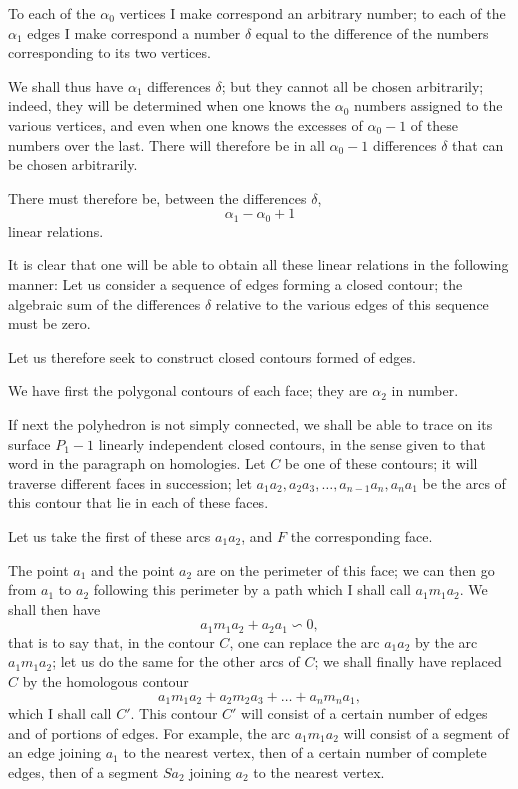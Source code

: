 \documentclass{article}
\begin{document}
To each of the $\alpha_{0}$ vertices I make correspond an arbitrary number; to each of the $\alpha_{1}$ edges I make correspond a number $\delta$ equal to the difference of the numbers corresponding to its two vertices.

We shall thus have $\alpha_{1}$ differences $\delta$; but they cannot all be chosen arbitrarily; indeed, they will be determined when one knows the $\alpha_{0}$ numbers assigned to the various vertices, and even when one knows the excesses of $\alpha_{0} - 1$ of these numbers over the last. There will therefore be in all $\alpha_{0} - 1$ differences $\delta$ that can be chosen arbitrarily.

There must therefore be, between the differences $\delta$,
\[ \alpha_{1} - \alpha_{0} + 1 \]
linear relations.

It is clear that one will be able to obtain all these linear relations in the following manner: Let us consider a sequence of edges forming a closed contour; the algebraic sum of the differences $\delta$ relative to the various edges of this sequence must be zero.

Let us therefore seek to construct closed contours formed of edges.

We have first the polygonal contours of each face; they are $\alpha_{2}$ in number.

If next the polyhedron is not simply connected, we shall be able to trace on its surface $P_{1} - 1$ linearly independent closed contours, in the sense given to that word in the paragraph on homologies. Let $C$ be one of these contours; it will traverse different faces in succession; let $a_{1}a_{2}, a_{2}a_{3}, \ldots, a_{n-1}a_{n}, a_{n}a_{1}$ be the arcs of this contour that lie in each of these faces.

Let us take the first of these arcs $a_{1}a_{2}$, and $F$ the corresponding face.

The point $a_{1}$ and the point $a_{2}$ are on the perimeter of this face; we can then go from $a_{1}$ to $a_{2}$ following this perimeter by a path which I shall call $a_{1}m_{1}a_{2}$. We shall then have
\[ a_{1}m_{1}a_{2} + a_{2}a_{1} \backsim 0, \]
that is to say that, in the contour $C$, one can replace the arc $a_{1}a_{2}$ by the arc $a_{1}m_{1}a_{2}$; let us do the same for the other arcs of $C$; we shall finally have replaced $C$ by the homologous contour
\[ a_{1}m_{1}a_{2} + a_{2}m_{2}a_{3} + \ldots + a_{n}m_{n}a_{1}, \]
which I shall call $C'$. This contour $C'$ will consist of a certain number of edges and of portions of edges. For example, the arc $a_{1}m_{1}a_{2}$ will consist of a segment of an edge joining $a_{1}$ to the nearest vertex, then of a certain number of complete edges, then of a segment $Sa_{2}$ joining $a_{2}$ to the nearest vertex.
\end{document}
